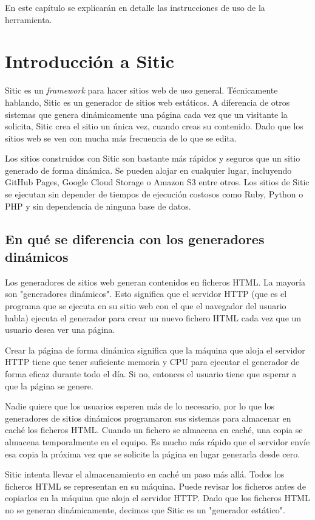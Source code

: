 En este capítulo se explicarán en detalle las instrucciones de uso de la herramienta.

\section{Introducción a Sitic}

Sitic es un \textit{framework} para hacer sitios web de uso general. Técnicamente hablando, Sitic es un generador de sitios web estáticos.
A diferencia de otros sistemas que genera dinámicamente una página cada vez que un visitante la solicita, Sitic crea el sitio
un única vez, 
cuando creas su contenido. Dado que los sitios web se ven con mucha más frecuencia de lo que se edita.

Los sitios construidos con Sitic son bastante más rápidos y seguros que un sitio generado de forma dinámica.
Se pueden alojar en cualquier lugar, incluyendo GitHub Pages, Google Cloud Storage o Amazon
S3 entre otros. Los sitios de Sitic se ejecutan sin depender de tiempos de ejecución costosos como Ruby, Python
o PHP y sin dependencia de ninguna base de datos.

\subsection{En qué se diferencia con los generadores dinámicos}

Los generadores de sitios web generan contenidos en ficheros HTML. La mayoría son "generadores dinámicos".
Esto significa que el servidor HTTP (que es el programa que se ejecuta en su sitio web con el que el navegador del
usuario habla) ejecuta el generador para crear un nuevo fichero HTML cada vez que un usuario desea ver una página.

Crear la página de forma dinámica significa que la máquina que aloja el servidor HTTP tiene que tener suficiente
memoria y CPU para ejecutar el generador de forma eficaz durante todo el día. Si no, entonces el usuario tiene que
esperar a que la página se genere.

Nadie quiere que los usuarios esperen más de lo necesario, por lo que los generadores de sitios dinámicos programaron
sus sistemas para almacenar en caché los ficheros HTML. Cuando un fichero se almacena en caché, una copia se
almacena temporalmente en el equipo. Es mucho más rápido que el servidor envíe esa copia la próxima vez que
se solicite la página en lugar generarla desde cero.

Sitic intenta llevar el almacenamiento en caché un paso más allá. Todos los ficheros HTML se representan en su máquina.
Puede revisar los ficheros antes de copiarlos en la máquina que aloja el servidor HTTP. Dado que los ficheros HTML
no se generan dinámicamente, decimos que Sitic es un "generador estático".

